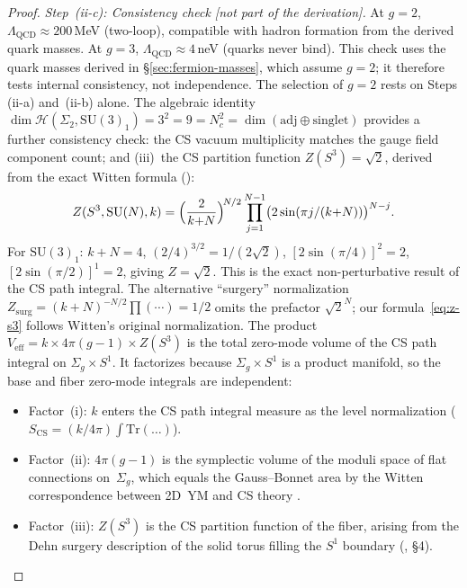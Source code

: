 \begin{proof}
\emph{Step~(ii-c): Consistency check [not part of the derivation].}
At $g = 2$, $\Lambda_{\mathrm{QCD}} \approx 200$\,MeV
(two-loop), compatible with hadron formation
from the derived quark masses.
At $g = 3$, $\Lambda_{\mathrm{QCD}} \approx 4$\,neV
(quarks never bind).
This check uses the quark masses derived in
\S\ref{sec:fermion-masses}, which assume $g = 2$;
it therefore tests internal consistency, not independence.
The selection of $g = 2$ rests on Steps (ii-a) and~(ii-b)
alone.
The algebraic identity
$\dim\mathcal{H}(\Sigma_2, \mathrm{SU}(3)_1)
= 3^2 = 9 = N_c^2 = \dim(\mathrm{adj} \oplus
\mathrm{singlet})$
provides a further consistency check:
the CS vacuum multiplicity matches the
gauge field component count; and
(iii)~the CS partition function $Z(S^3) = \sqrt{2}$,
derived from the exact Witten formula
(\citealt{Witten1989Jones}):
\begin{equation}\label{eq:z-s3}
  Z(S^3, \mathrm{SU}(N), k)
  = \Bigl(\frac{2}{k{+}N}\Bigr)^{\!N/2}
    \prod_{j=1}^{N-1}\bigl(2\sin(\pi j/(k{+}N))\bigr)^{N-j}.
\end{equation}
For $\mathrm{SU}(3)_1$: $k{+}N = 4$,
$(2/4)^{3/2} = 1/(2\sqrt{2})$,
$[2\sin(\pi/4)]^2 = 2$,
$[2\sin(\pi/2)]^1 = 2$,
giving $Z = \sqrt{2}$.
This is the exact non-perturbative
result of the CS path integral.
The alternative ``surgery'' normalization
$Z_{\mathrm{surg}} = (k{+}N)^{-N/2}\prod(\cdots) = 1/2$
omits the prefactor $\sqrt{2}^N$; our formula~\eqref{eq:z-s3}
follows Witten's original normalization.
The product $V_{\mathrm{eff}} = k \times 4\pi(g{-}1) \times
Z(S^3)$ is the total zero-mode volume of the CS path integral
on $\Sigma_g \times S^1$.
It factorizes because $\Sigma_g \times S^1$ is a product manifold,
so the base and fiber zero-mode integrals are independent:
\begin{itemize}
\item Factor~(i): $k$ enters the CS path integral measure
  as the level normalization
  ($S_{\mathrm{CS}} = (k/4\pi)\int\mathrm{Tr}(\ldots)$).
\item Factor~(ii): $4\pi(g{-}1)$ is the symplectic volume of the
  moduli space of flat connections on~$\Sigma_g$, which equals
  the Gauss--Bonnet area by the Witten correspondence between
  2D~YM and CS theory
  \citep{Witten1992TwoDimensions}.
\item Factor~(iii): $Z(S^3)$ is the CS partition function of the
  fiber, arising from the Dehn surgery description of the
  solid torus filling the $S^1$ boundary
  (\citealt{Witten1989Jones}, \S4).
\end{itemize}

\end{proof}
